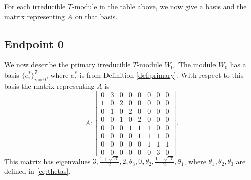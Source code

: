 \documentclass[12pt,letterpaper]{article}
\begin{document}

\begin{center}
\smallskip
{}
\end{center}

For each irreducible $T$-module in the table above, we now give a basis and the matrix representing $A$ on that basis. 

\subsection{Endpoint 0}

We now describe the primary irreducible $T$-module $W_0$. The module $W_0$ has a basis $\{e_i^*\}_{i=0}^7$, where $e_i^*$ is from Definition \ref{def:primary}. With respect to this basis the matrix representing $A$ is
\begin{equation}
    A: \begin{bmatrix}
  0 & 3 & 0 & 0 & 0 & 0 & 0 & 0 \\
  1 & 0 & 2 & 0 & 0 & 0 & 0 & 0 \\
  0 & 1 & 0 & 2 & 0 & 0 & 0 & 0 \\
  0 & 0 & 1 & 0 & 2 & 0 & 0 & 0 \\
  0 & 0 & 0 & 1 & 1 & 1 & 0 & 0 \\
  0 & 0 & 0 & 0 & 1 & 1 & 1 & 0 \\
  0 & 0 & 0 & 0 & 0 & 1 & 1 & 1 \\
  0 & 0 & 0 & 0 & 0 & 0 & 3 & 0 \end{bmatrix}.
\label{eq:bs-I}
\end{equation}
This matrix has eigenvalues $3, \frac{1+\sqrt{17}}{2}, 2, \theta_3, 0, \theta_2, \frac{1-\sqrt{17}}{2}, \theta_1$, where $\theta_1, \theta_2, \theta_3 $ are defined in \eqref{eq:thetas}.
\end{document}
